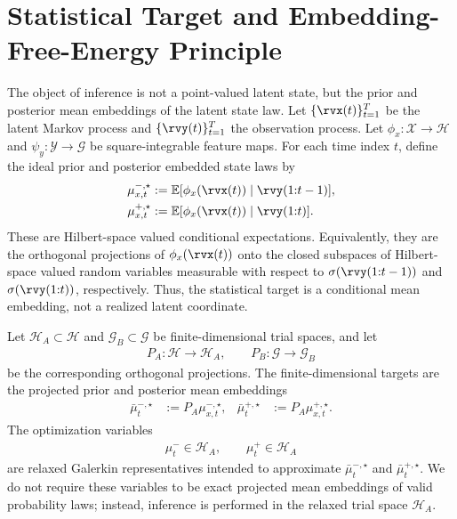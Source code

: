 \documentclass[twoside,11pt]{article}
\begin{document}
\section{Statistical Target and Embedding-Free-Energy Principle}
\label{sec:statistical_objective}

The object of inference is not a point-valued latent state, but the
prior and posterior mean embeddings of the latent state law. Let
$\{\rvx(t)\}_{t=1}^T$ be the latent Markov process and
$\{\rvy(t)\}_{t=1}^T$ the observation process. Let
$\phi_x:\mathcal X\to\mathcal H$ and
$\psi_y:\mathcal Y\to\mathcal G$ be square-integrable feature maps.
For each time index $t$, define the ideal prior and posterior embedded
state laws by
\begin{align}
\mu_{x,t}^{-,\star}
&:=
\mathbb E[
\phi_x(\rvx(t))
\mid
\rvy(1{:}t-1)
],
\label{eq:ideal_prior_embedding}
\\
\mu_{x,t}^{+,\star}
&:=
\mathbb E[
\phi_x(\rvx(t))
\mid
\rvy(1{:}t)
].
\label{eq:ideal_posterior_embedding}
\end{align}
These are Hilbert-space valued conditional expectations. Equivalently,
they are the orthogonal projections of $\phi_x(\rvx(t))$ onto the
closed subspaces of Hilbert-space valued random variables measurable
with respect to $\sigma(\rvy(1{:}t-1))$ and $\sigma(\rvy(1{:}t))$,
respectively. Thus, the statistical target is a conditional mean
embedding, not a realized latent coordinate.

Let $\mathcal H_A\subset\mathcal H$ and
$\mathcal G_B\subset\mathcal G$ be finite-dimensional trial spaces, and
let
\begin{align}
P_A:\mathcal H\to\mathcal H_A,
\qquad
P_B:\mathcal G\to\mathcal G_B
\label{eq:projection_operators_statistical}
\end{align}
be the corresponding orthogonal projections. The finite-dimensional
targets are the projected prior and posterior mean embeddings
\begin{align}
\bar\mu_{t}^{-,\star}
&:=
P_A\mu_{x,t}^{-,\star},
&
\bar\mu_{t}^{+,\star}
&:=
P_A\mu_{x,t}^{+,\star}.
\label{eq:projected_prior_posterior_embeddings}
\end{align}
The optimization variables
\begin{align}
\mu_t^- \in \mathcal H_A,
\qquad
\mu_t^+ \in \mathcal H_A
\label{eq:prior_posterior_variables_hilbert}
\end{align}
are relaxed Galerkin representatives intended to approximate
$\bar\mu_t^{-,\star}$ and $\bar\mu_t^{+,\star}$. We do not require
these variables to be exact projected mean embeddings of valid
probability laws; instead, inference is performed in the relaxed trial
space $\mathcal H_A$.
\end{document}
